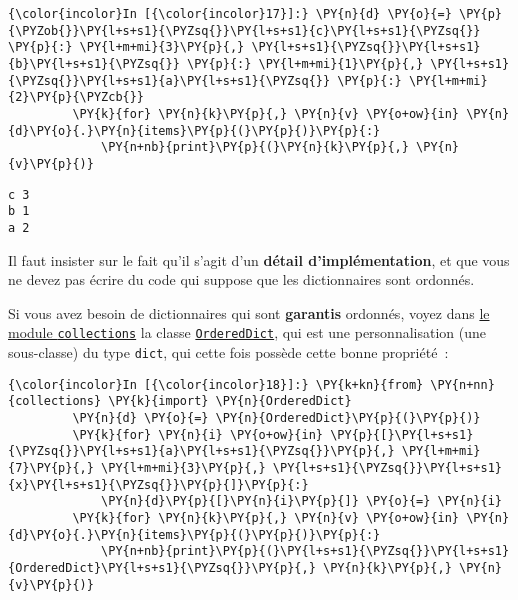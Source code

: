     \begin{Verbatim}[commandchars=\\\{\}]
{\color{incolor}In [{\color{incolor}17}]:} \PY{n}{d} \PY{o}{=} \PY{p}{\PYZob{}}\PY{l+s+s1}{\PYZsq{}}\PY{l+s+s1}{c}\PY{l+s+s1}{\PYZsq{}} \PY{p}{:} \PY{l+m+mi}{3}\PY{p}{,} \PY{l+s+s1}{\PYZsq{}}\PY{l+s+s1}{b}\PY{l+s+s1}{\PYZsq{}} \PY{p}{:} \PY{l+m+mi}{1}\PY{p}{,} \PY{l+s+s1}{\PYZsq{}}\PY{l+s+s1}{a}\PY{l+s+s1}{\PYZsq{}} \PY{p}{:} \PY{l+m+mi}{2}\PY{p}{\PYZcb{}}
         \PY{k}{for} \PY{n}{k}\PY{p}{,} \PY{n}{v} \PY{o+ow}{in} \PY{n}{d}\PY{o}{.}\PY{n}{items}\PY{p}{(}\PY{p}{)}\PY{p}{:}
             \PY{n+nb}{print}\PY{p}{(}\PY{n}{k}\PY{p}{,} \PY{n}{v}\PY{p}{)}
\end{Verbatim}


    \begin{Verbatim}[commandchars=\\\{\}]
c 3
b 1
a 2

    \end{Verbatim}

    Il faut insister sur le fait qu'il s'agit d'un \textbf{détail
d'implémentation}, et que vous ne devez pas écrire du code qui suppose
que les dictionnaires sont ordonnés.

    Si vous avez besoin de dictionnaires qui sont \textbf{garantis}
ordonnés, voyez dans
\href{https://docs.python.org/3/library/collections.html}{le module
\texttt{collections}} la classe
\href{https://docs.python.org/3/library/collections.html\#collections.OrderedDict}{\texttt{OrderedDict}},
qui est une personnalisation (une sous-classe) du type \texttt{dict},
qui cette fois possède cette bonne propriété~:

    \begin{Verbatim}[commandchars=\\\{\}]
{\color{incolor}In [{\color{incolor}18}]:} \PY{k+kn}{from} \PY{n+nn}{collections} \PY{k}{import} \PY{n}{OrderedDict}
         \PY{n}{d} \PY{o}{=} \PY{n}{OrderedDict}\PY{p}{(}\PY{p}{)}
         \PY{k}{for} \PY{n}{i} \PY{o+ow}{in} \PY{p}{[}\PY{l+s+s1}{\PYZsq{}}\PY{l+s+s1}{a}\PY{l+s+s1}{\PYZsq{}}\PY{p}{,} \PY{l+m+mi}{7}\PY{p}{,} \PY{l+m+mi}{3}\PY{p}{,} \PY{l+s+s1}{\PYZsq{}}\PY{l+s+s1}{x}\PY{l+s+s1}{\PYZsq{}}\PY{p}{]}\PY{p}{:}
             \PY{n}{d}\PY{p}{[}\PY{n}{i}\PY{p}{]} \PY{o}{=} \PY{n}{i}
         \PY{k}{for} \PY{n}{k}\PY{p}{,} \PY{n}{v} \PY{o+ow}{in} \PY{n}{d}\PY{o}{.}\PY{n}{items}\PY{p}{(}\PY{p}{)}\PY{p}{:}
             \PY{n+nb}{print}\PY{p}{(}\PY{l+s+s1}{\PYZsq{}}\PY{l+s+s1}{OrderedDict}\PY{l+s+s1}{\PYZsq{}}\PY{p}{,} \PY{n}{k}\PY{p}{,} \PY{n}{v}\PY{p}{)}
\end{Verbatim}


